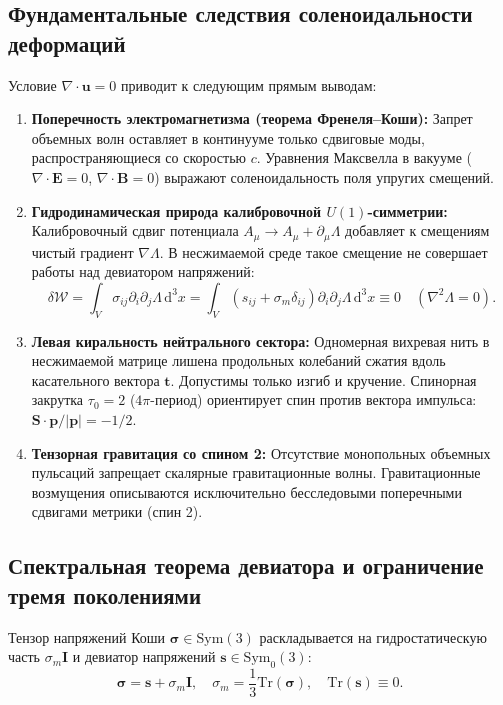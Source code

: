\documentclass[11pt,a4paper]{article}
\theoremstyle{definition}
\theoremstyle{remark}
\begin{document}
\subsection{Фундаментальные следствия соленоидальности деформаций}
Условие $\nabla \cdot \mathbf{u} = 0$ приводит к следующим прямым выводам:
\begin{enumerate}
    \item \textbf{Поперечность электромагнетизма (теорема Френеля--Коши):} Запрет объемных волн оставляет в континууме только сдвиговые моды, распространяющиеся со скоростью $c$. Уравнения Максвелла в вакууме ($\nabla \cdot \mathbf{E} = 0$, $\nabla \cdot \mathbf{B} = 0$) выражают соленоидальность поля упругих смещений.
    \item \textbf{Гидродинамическая природа калибровочной $U(1)$-симметрии:} Калибровочный сдвиг потенциала $A_\mu \to A_\mu + \partial_\mu \Lambda$ добавляет к смещениям чистый градиент $\nabla \Lambda$. В несжимаемой среде такое смещение не совершает работы над девиатором напряжений:
    \begin{equation}
        \delta \mathcal{W} = \int_V \sigma_{ij} \partial_i \partial_j \Lambda \, \mathrm{d}^3 x = \int_V (s_{ij} + \sigma_m \delta_{ij}) \partial_i \partial_j \Lambda \, \mathrm{d}^3 x \equiv 0 \quad (\nabla^2 \Lambda = 0).
    \end{equation}
    \item \textbf{Левая киральность нейтрального сектора:} Одномерная вихревая нить в несжимаемой матрице лишена продольных колебаний сжатия вдоль касательного вектора $\mathbf{t}$. Допустимы только изгиб и кручение. Спинорная закрутка $\tau_0 = 2$ ($4\pi$-период) ориентирует спин против вектора импульса: $\mathbf{S}\cdot\mathbf{p}/|\mathbf{p}| = -1/2$.
    \item \textbf{Тензорная гравитация со спином 2:} Отсутствие монопольных объемных пульсаций запрещает скалярные гравитационные волны. Гравитационные возмущения описываются исключительно бесследовыми поперечными сдвигами метрики (спин 2).
\end{enumerate}

\subsection{Спектральная теорема девиатора и ограничение тремя поколениями}
Тензор напряжений Коши $\boldsymbol{\sigma} \in \mathrm{Sym}(3)$ раскладывается на гидростатическую часть $\sigma_m \mathbf{I}$ и девиатор напряжений $\mathbf{s} \in \mathrm{Sym}_0(3)$:
\begin{equation}
    \boldsymbol{\sigma} = \mathbf{s} + \sigma_m \mathbf{I}, \quad \sigma_m = \frac{1}{3}\mathrm{Tr}(\boldsymbol{\sigma}), \quad \mathrm{Tr}(\mathbf{s}) \equiv 0.
\end{equation}
\end{document}
